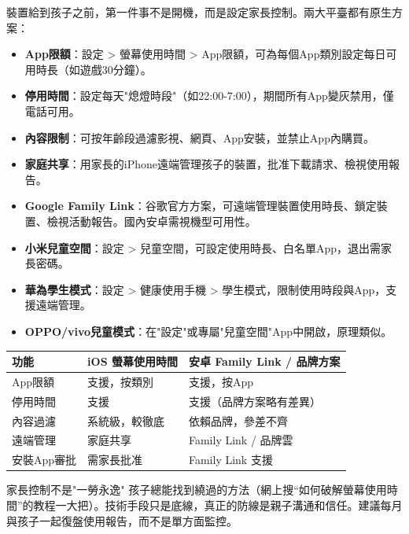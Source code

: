 
裝置給到孩子之前，第一件事不是開機，而是設定家長控制。兩大平臺都有原生方案：


\begin{itemize}
  \item \textbf{App限額}：設定 > 螢幕使用時間 > App限額，可為每個App類別設定每日可用時長（如遊戲30分鐘）。
  \item \textbf{停用時間}：設定每天"熄燈時段"（如22:00-7:00），期間所有App變灰禁用，僅電話可用。
  \item \textbf{內容限制}：可按年齡段過濾影視、網頁、App安裝，並禁止App內購買。
  \item \textbf{家庭共享}：用家長的iPhone遠端管理孩子的裝置，批准下載請求、檢視使用報告。
\end{itemize}


\begin{itemize}
  \item \textbf{Google Family Link}：谷歌官方方案，可遠端管理裝置使用時長、鎖定裝置、檢視活動報告。國內安卓需視機型可用性。
  \item \textbf{小米兒童空間}：設定 > 兒童空間，可設定使用時長、白名單App，退出需家長密碼。
  \item \textbf{華為學生模式}：設定 > 健康使用手機 > 學生模式，限制使用時段與App，支援遠端管理。
  \item \textbf{OPPO/vivo兒童模式}：在"設定"或專屬"兒童空間"App中開啟，原理類似。
\end{itemize}

\begin{center}
\begin{tabularx}{\linewidth}{|X|X|X|}
\hline
\textbf{功能} & \textbf{iOS 螢幕使用時間} & \textbf{安卓 Family Link / 品牌方案} \tabularnewline
\hline
App限額 & 支援，按類別 & 支援，按App \tabularnewline
停用時間 & 支援 & 支援（品牌方案略有差異） \tabularnewline
內容過濾 & 系統級，較徹底 & 依賴品牌，參差不齊 \tabularnewline
遠端管理 & 家庭共享 & Family Link / 品牌雲 \tabularnewline
安裝App審批 & 需家長批准 & Family Link 支援 \tabularnewline
\hline
\end{tabularx}
\end{center}

\begin{tcbwarn}{家長控制不是"一勞永逸"}
孩子總能找到繞過的方法（網上搜“如何破解螢幕使用時間”的教程一大把）。技術手段只是底線，真正的防線是親子溝通和信任。建議每月與孩子一起復盤使用報告，而不是單方面監控。

\end{tcbwarn}

